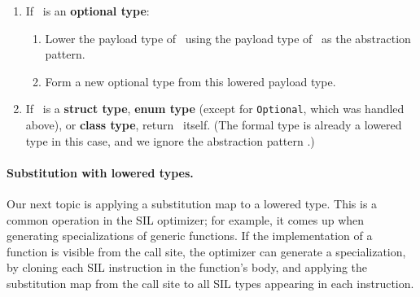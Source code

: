 \documentclass[../generics]{subfiles}
\begin{document}
\begin{algorithm}
\begin{enumerate}
\item If \tX\ is an \textbf{optional type}:
\begin{enumerate}
\item Lower the payload type of \tX\ using the payload type of \tY\ as the abstraction pattern.
\item Form a new optional type from this lowered payload type.
\end{enumerate}

\item If \tX\ is a \textbf{struct type}, \textbf{enum type} (except for \texttt{Optional}, which was handled above), or \textbf{class type}, return \tX\ itself. (The formal type is already a lowered type in this case, and we ignore the abstraction pattern \tY.)
\end{enumerate}
\end{algorithm}

\paragraph{Substitution with lowered types.}
Our next topic is applying a substitution map to a lowered type. This is a common operation in the SIL optimizer; for example, it comes up when generating specializations of generic functions. If the implementation of a function is visible from the call site, the optimizer can generate a specialization, by cloning each SIL instruction in the function's body, and applying the substitution map from the call site to all SIL types appearing in each instruction.
\end{document}
